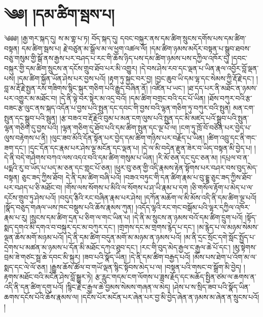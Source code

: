 \chapter{༄༅། །དམ་ཚིག་སྦས་པ།}༄༅༅། །རྒྱ་གར་སྐད་དུ། ས་མ་གྷ་པ་ཏ། བོད་སྐད་དུ། དབང་བསྐུར་ནས་དམ་ཚིག་སྲུངས་དགོས་པས་དམ་ཚིག་བསྟན། དམ་ཚིག་སྦས་པ། རྗེ་བཙུན་མ་སྒྲོལ་མ་ལ་ཕྱག་འཚལ་ལོ། །དམ་ཚིག་ཉམས་མདོར་བསྟན་པ་སྒྲུབ་ཐབས་བཅུ་གསུམ་གྱི་སྒོ་ནས་རྒྱས་པར་བཤད་པ་རང་གི་ཆོས་ཉིད་པས་དམ་ཚིག་ཉམས་པས་དཀྱིལ་འཁོར་དུ། །དབང་བསྐུར་གྱི་དམ་ཚིག་སྲུངས་ན་དངོས་གྲུབ་ཐོབ་པར་མི་འགྱུར། །དེ་བས་ཤེས་རབ་དང་ལྡན་པ་ཡིན་རྣལ་འབྱོར་བློ་ལྡན་པས། །དམ་ཚིག་སྐྱོན་ཡོན་ཤེས་པར་བྱས་པའོ། །རྟག་ཏུ་སྐྱང་བར་བྱ། །བྱང་ཆུབ་ཡི་དམ་ལྷ་དང་སེམས་ཀྱི་རྡོ་རྗེ་དང་། །བླ་མ་རྡོ་རྗེ་སྤྱན་རས་གཟིགས་སྙིང་སྐུར་གཅིག་པའི་རྒྱུད་བཞིན་ནོ། །འཛིན་པ་ཡང་། །ཐ་དད་པར་ནི་མཐོང་ན་ཉམས་པར་འགྱུར་མ་མཐོང་བ། །དེ་ནི་ལྟེ་བར་སྟེར་མ་འདྲ་བའོ། །དམ་ཚིག་བགྲང་བའི་དང་པོ་ཡིན། །ཐོས་བཀུར་བའི་རྩ་བཟང་རྩ་ལུང་ནས་སྐད་འདོན་པ་བྱས་པའི་སྤུན་དང་དབང་གི་བྱས་བའི་ལྷན་གཅིག་ཏུ་བཀུར་བའི་སྤུན། མན་ངག་སྤུན་དང་སྒྲུབ་པའི་སྦུན། །རྩ་བཟའ་བ་རྡོ་རྗེའི་བུམ་པ་མན་ངག་ལུས་པའི་སྤུན་དང་མི་མཛད་པའོ་སྒྲུབ་པའི་སྤུན་ལྷན་གཅིག་དུ་བྱས་པའི། །ལྷན་གཅིག་དུ་ཐོབ་པའི་དམ་ཚིག་སྤུན་དང་ལྔ་པོ་ལ། །ངག་ཏུ་ཁྲོ་བོ་བཙོན་པར་བྱེད་པ་ལུས་བརྟེགས་པ་ནི། །ལུང་ཟབ་མོའི་དོན་སྟོན་པར་བྱེད་དམ་ཚིག་གཉིས་པར་བརྗོད་པ་ཡིན། །ཚིག་འབྲུ་དང་ནི་གང་ཟག་དང་། །དྲང་དོན་དང་རྣམ་པར་ཤེས་ལྔ་མངོན་དང་ལྡན་པ། །དེ་ལ་མི་བདེན་རྫུན་ཟེར་བ་ཡིད་བསྟན་མི་བྱེད་པ། །དེ་ནི་བདེ་གཤེགས་བཀའ་ལས་འདའ་བའི་དམ་ཚིག་གསུམ་པ་ཡིན། །རི་མོ་ཅན་དང་དུང་ཅན་མ། །དཔྲལ་བ་ན་པདྨའི་རུ་བ་ཡོད་པ་པད་མ་ཅན་དང་གླང་པོ་ཅན། །ཕུར་བུ་ཅན་གྱི་འདི་རྣམས་རྟེན་སྟོགས་པར་བཤར་བས་བུད་མེད་བསྟན། ཅུང་ཟད་ཀྱིས་ཐོབ། དེ་ནི་དམ་ཚིག་བཞི་པའོ། །བཟའ་བཏུང་གི་དན་ཚིག་རྣམ་པ་བུ་དྔྷ་ཅུང་ཟད་ཀྱིས་ཐོབ་པར་བཤད་པ་ཅི་མཐོང་བ། །གོས་ལས་སོགས་པ་མིའི་ལ་སོགས་པ་ཤ་ཡི་རྣམ་པ་དག །ཅི་གསོལ་རྟོག་པ་མེད་པ་ལ་དངོས་གྲུབ་ཏུ་ཤེས་པའོ། །བདུད་རྕིའི་རང་བཞིན་རྣམ་པར་ཤེས། །དཀོན་མཆོག་ལ་མི་མོས་འདི་ནི་དམ་ཚིག་ལྔ་པའོ། །སྣོད་བཅུད་གཞལ་ཡས་ཁང་བསྡུས་པའི་ཆོས་རྣམས་ཀུན། །འདོད་ལྷའི་རང་གང་བསྒོམ་པའི་ལྷར་དཀྱིལ་འཁོར་རྣམ་པ་རུ། །སྲུངས་དམ་ཚིག་དྲན་པ་ཅིག་ལ་གང་ཡིན་པ། །དེ་ནི་མ་སྲུངས་ན་ཉམས་བའོ་དམ་ཚིག་དྲུག་པའོ། །སྟོད་སྨད་དགའ་མི་དགའ་བ་བསྐུར་དང་མ་བཀུར་དང་། །གྲགས་དང་མ་གྲགས་རྙེད་པ་དང་། །མ་རྙེད་པ་ལ་མཉམ་སེམས་ལྡན་ཆོས་མགོ་མཉམ་པའོ། །དེ་ནི་དམ་ཚིག་བདུན་མགོ་མ་མཉམ་ན་ཉམས་པའོ། །མ་ནི་དྲང་སྲོང་དགེ་སློང་སྤྱོད་པ་དྲེགས་པ་མཚན་མ་ཉམས་པ་དོན་མི་མཐོང་དཀའ་ཐུབ་དང་། །རང་གི་བུད་མེད་རྒྱལ་ང་རྒྱལ་ཆེ་པོ་དང་། །མུ་སྟེགས་བྲམ་ཟེ་གཙང་སྦྲ་ཆེ་དབང་མི་སྐུར། །ཟབ་པའི་སྣོད་ཡིན། །དེ་ནི་དམ་ཚིག་བརྒྱད་པའོ། །མོས་པས་ཐེག་པ་འོག་མ་ལ་སྨད་དང་ལེ་ལོ་ཅན། །རྒྱུས་ཆོས་ཚོལ་བ་གཡོ་ལྡན་སྙིང་སྟོབས་མེད་པ་ལ། །བསྟན་པའི་གསང་བ་སྒྲོག་མི་བྱེད། །རྟགས་མཐོང་བའི་མངོན་ཤེས་བློ་སྒྱུར་ཏེ། རྩ་རླུང་གདམ་ངག་ལོགས་པ་ཟླས་རྗོད་དང་མཆོད་སྤྱིན་ཙམ་ལ་ཆགས་ན་འདི་ནི་དན་ཚིག་དགུ་པའོ། །སྙིང་རྗེ་ང་རྒྱལ་ཆེ་བྱམས་སེམས་གཞན་ལ་མེད། །ཤེས་པ་ས་སྲིད་ཟབ་པའི་སྣོད་ཡིན་ཆགས་དངོས་པོའི་ཆོས་རྣམས་ལ། །དངོས་པོར་མངོན་པར་ཞེན་པར་བྱ་མི་བྱེད་ཞེན་ན་ཉམས་མ་ཞེན་ན་སྲུངས་པའོ། །
